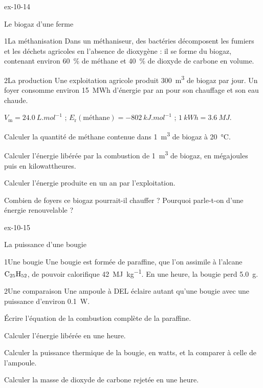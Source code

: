 \begin{blocLivre}{ex-10-14}
\begin{exercice}[3]{Le biogaz d'une ferme}
\begin{docu}{1}{La méthanisation}
Dans un méthaniseur, des bactéries décomposent les fumiers et les déchets agricoles en l'absence de dioxygène : il se
forme du biogaz, contenant environ \qty{60}{\percent} de méthane et \qty{40}{\percent} de dioxyde de carbone en volume.
\end{docu}
\begin{docu}{2}{La production}
Une exploitation agricole produit \qty{300}{m^3} de biogaz par jour. Un foyer consomme environ \qty{15}{MWh} d'énergie par an pour son
chauffage et son eau chaude.
\end{docu}
\begin{donnees}
$V_\mathrm{m}=\qty{24,0}{L.mol^{-1}}$ ; $E_\mathrm{r}(\text{méthane})=\qty{-802}{kJ.mol^{-1}}$ ; $\qty{1}{kWh}=\qty{3,6}{MJ}$.
\end{donnees}
\begin{questions}
\item Calculer la quantité de méthane contenue dans \qty{1}{m^3} de biogaz à \qty{20}{\degreeCelsius}.
\item Calculer l'énergie libérée par la combustion de \qty{1}{m^3} de biogaz, en mégajoules puis en kilowattheures.
\item Calculer l'énergie produite en un an par l'exploitation.
\item \initiative Combien de foyers ce biogaz pourrait-il chauffer ? Pourquoi parle-t-on d'une énergie renouvelable ?
\end{questions}
\end{exercice}
\end{blocLivre}
\begin{blocLivre}{ex-10-15}
\begin{exercice}[3]{La puissance d'une bougie}
\begin{docu}{1}{Une bougie}
Une bougie est formée de paraffine, que l'on assimile à l'alcane $\ce{C25H52}$, de pouvoir calorifique \qty{42}{MJ.kg^{-1}}. En une heure,
la bougie perd \qty{5,0}{g}.
\end{docu}
\begin{docu}{2}{Une comparaison}
Une ampoule à DEL éclaire autant qu'une bougie avec une puissance d'environ \qty{0,1}{W}.
\end{docu}
\begin{questions}
\item Écrire l'équation de la combustion complète de la paraffine.
\item Calculer l'énergie libérée en une heure.
\item \initiative Calculer la puissance thermique de la bougie, en watts, et la comparer à celle de l'ampoule.
\item Calculer la masse de dioxyde de carbone rejetée en une heure.
\end{questions}
\end{exercice}
\end{blocLivre}
